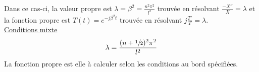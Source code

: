 Dans ce cas-ci, la valeur propre est $\lambda=\beta^2=\frac{n^2\pi^2}{l^2}$ trouvée en
résolvant $\frac{-X''}{X}=\lambda$ et la fonction propre est $T(t)=e^{-j\beta^2t}$
trouvée en résolvant $j\frac{T'}{T}=\lambda$.\\
\underline{Conditions mixte}\\
\begin{equation*}
    \lambda=\frac{(n+\sfrac{1}{2})^2\pi^2}{l^2}
\end{equation*}
La fonction propre est elle à calculer selon les conditions au bord spécifiées.\\

